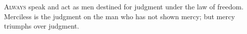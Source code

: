 
\lettrine{A}{lways} speak and act as men destined for judgment under the law of freedom. Merciless is the judgment on the man who has not shown mercy; but mercy triumphs over judgment.